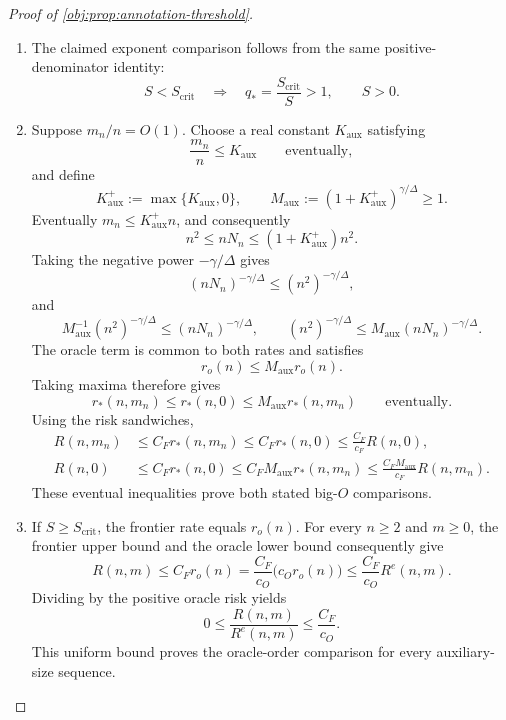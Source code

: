 \documentclass[11pt]{article}
\begin{document}
\begin{proof}[Proof of \cref{obj:prop:annotation-threshold}]
\begin{enumerate}
\item
The claimed exponent comparison follows from the same positive-denominator identity:
\[
S<S_{\mathrm{crit}}
\quad\Longrightarrow\quad
q_*=\frac{S_{\mathrm{crit}}}{S}>1,
\qquad S>0.
\]

\item
Suppose \(m_n/n=O(1)\). Choose a real constant \(K_{\mathrm{aux}}\) satisfying
\[
\frac{m_n}{n}\le K_{\mathrm{aux}}
\qquad\text{eventually},
\]
and define
\[
K_{\mathrm{aux}}^+:=\max\{K_{\mathrm{aux}},0\},
\qquad
M_{\mathrm{aux}}
:=(1+K_{\mathrm{aux}}^+)^{\gamma/\Delta}\ge1.
\]
Eventually \(m_n\le K_{\mathrm{aux}}^+n\), and consequently
\[
n^2\le nN_n\le(1+K_{\mathrm{aux}}^+)n^2.
\]
Taking the negative power \(-\gamma/\Delta\) gives
\[
(nN_n)^{-\gamma/\Delta}\le(n^2)^{-\gamma/\Delta},
\]
and
\[
M_{\mathrm{aux}}^{-1}(n^2)^{-\gamma/\Delta}
\le(nN_n)^{-\gamma/\Delta},
\qquad
(n^2)^{-\gamma/\Delta}
\le M_{\mathrm{aux}}(nN_n)^{-\gamma/\Delta}.
\]
The oracle term is common to both rates and satisfies
\[
r_o(n)\le M_{\mathrm{aux}}r_o(n).
\]
Taking maxima therefore gives
\[
r_*(n,m_n)\le r_*(n,0)
\le M_{\mathrm{aux}}r_*(n,m_n)
\qquad\text{eventually}.
\]
Using the risk sandwiches,
\[
\begin{aligned}
R(n,m_n)
&\le C_F r_*(n,m_n)
\le C_F r_*(n,0)
\le \frac{C_F}{c_F}R(n,0),\\
R(n,0)
&\le C_F r_*(n,0)
\le C_F M_{\mathrm{aux}}r_*(n,m_n)
\le \frac{C_F M_{\mathrm{aux}}}{c_F}R(n,m_n).
\end{aligned}
\]
These eventual inequalities prove both stated big-\(O\) comparisons.

\item
If \(S\ge S_{\mathrm{crit}}\), the frontier rate equals \(r_o(n)\). For every \(n\ge2\) and \(m\ge0\), the frontier upper bound and the oracle lower bound consequently give
\[
R(n,m)
\le C_F r_o(n)
=\frac{C_F}{c_O}\bigl(c_O r_o(n)\bigr)
\le\frac{C_F}{c_O}R^e(n,m).
\]
Dividing by the positive oracle risk yields
\[
0\le\frac{R(n,m)}{R^e(n,m)}
\le\frac{C_F}{c_O}.
\]
This uniform bound proves the oracle-order comparison for every auxiliary-size sequence.


\end{enumerate}
\end{proof}
\end{document}
